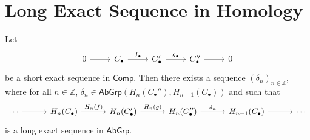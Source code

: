 \section*{Long Exact Sequence in Homology}
\begin{theorem}
	Let
	\begin{equation*}
		\begin{tikzcd}
			0 \arrow[r] & C_\bullet \arrow[r,"f_\bullet"] & C'_\bullet \arrow[r,"g_\bullet"] & C_\bullet'' \arrow[r] & 0
		\end{tikzcd}
	\end{equation*}
	\noindent be a short exact sequence in $\mathsf{Comp}$. Then there exists a sequence $(\delta_n)_{n \in \mathbb{Z}}$, where for all $n \in \mathbb{Z}$, $\delta_n \in \mathsf{AbGrp}(H_n(C_\bullet''),H_{n - 1}(C_\bullet))$ and such that
	\begin{equation*}
		\begin{tikzcd}[column sep=7ex]
			\cdots \arrow[r] & H_n(C_\bullet) \arrow[r,"H_n(f)"] & H_n(C'_\bullet) \arrow[r,"H_n(g)"] & H_n(C''_\bullet) \arrow[r,"\delta_n"] & H_{n - 1}(C_\bullet) \arrow[r] & \cdots
		\end{tikzcd} 
	\end{equation*}
	\noindent is a long exact sequence in $\mathsf{AbGrp}$.
	\label{thm:les_homology}
\end{theorem}

